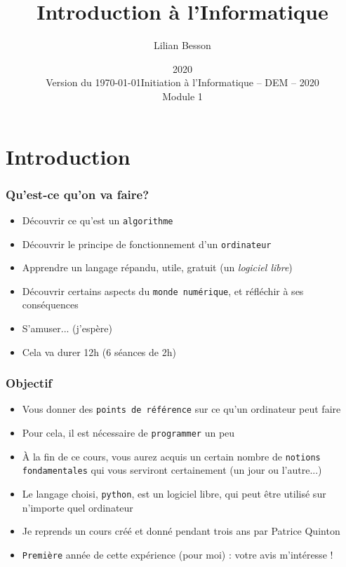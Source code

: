 \documentclass{beamer}
\title{Introduction à l'Informatique}
\author{Lilian Besson}
\date{2020\\Version du \today}
\institute%
{ENS Rennes}
\date%
[Info - DEM - 2020]{Initiation à l'Informatique -- DEM -- 2020\\Module 1}%
\newcommand{\mypause}{\pause}
\newcommand{\pyth}{{\sc python}}
\newcommand{\prog}[1]{\alert{\texttt{#1}}}
\begin{document}
\frame{\titlepage}

\section[Outline]{}
\frame{\tableofcontents}

\section{Introduction}


\frame
{
  \frametitle{Qu'est-ce qu'on va faire?}

  \begin{itemize}
  \item Découvrir ce qu'est un \prog{algorithme}\mypause{}
  \item Découvrir le principe de fonctionnement d'un \prog{ordinateur}\mypause{}
  \item Apprendre un langage répandu, utile, gratuit (un {\em logiciel libre})\mypause{}
  \item Découvrir certains aspects du \prog{monde numérique}, et réfléchir à ses conséquences\mypause{}
  \item S'amuser... (j'espère)\mypause{}
  \item Cela va durer 12h (6 séances de 2h)\mypause{}
  \end{itemize}
}



\frame
{
  \frametitle{Objectif}

  \begin{itemize}
  \item Vous donner des \prog{points de référence} sur ce qu'un ordinateur peut faire\mypause{}
  \item Pour cela, il est nécessaire de \prog{programmer} un peu\mypause{}
  \item À la fin de ce cours, vous aurez acquis un certain nombre de \prog{notions fondamentales}
  qui vous serviront certainement (un jour ou l'autre...)\mypause{}
  \item Le langage choisi, \prog{\pyth{}}, est un logiciel libre, qui peut être utilisé sur
  n'importe quel ordinateur\mypause{}
  \item Je reprends un cours créé et donné pendant trois ans par Patrice Quinton
  \item \prog{Première} année de cette expérience (pour moi) : votre avis m'intéresse !
  \end{itemize}
}
\end{document}
